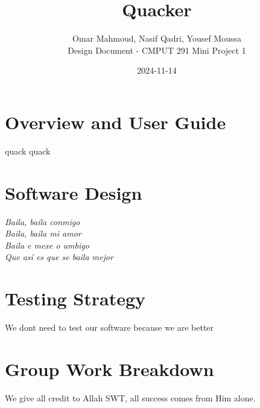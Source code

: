 \documentclass[12pt]{article}
\begin{document}
\title{\huge Quacker}
\author{Omar Mahmoud,  Nasif Qadri,  Yousef Moussa\\[0.5cm] 
Design Document - CMPUT 291 Mini Project 1\\}
\date{2024-11-14}

\maketitle
\newpage


\section{Overview and User Guide}
quack quack
\newpage

\section{Software Design}
\begin{center}
\textit{
Baila, baila conmigo\\
Baila, baila mi amor\\
Baila e mexe o umbigo\\
Que así es que se baila mejor\\
}
\end{center}
\newpage

\section{Testing Strategy}
We dont need to test our software because we are better
\newpage


\section{Group Work Breakdown}
We give all credit to Allah SWT, all success comes from Him alone.
\end{document}
